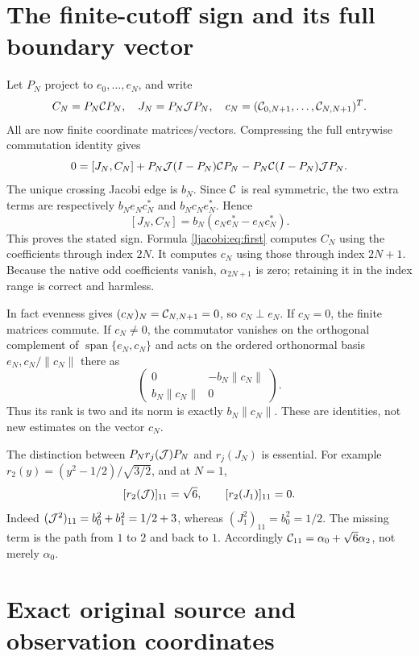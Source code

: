 \section{The finite-cutoff sign and its full boundary vector}

Let $P_N$ project to $e_0,\ldots,e_N$, and write
\[
 C_N=P_N\mathcal C P_N,\quad J_N=P_N\mathcal J P_N,\quad
 c_N=(\mathcal C_{0,N+1},\ldots,\mathcal C_{N,N+1})^T.
\]
All are now finite coordinate matrices/vectors. Compressing the
full entrywise commutation identity gives
\[
 0=[J_N,C_N]+P_N\mathcal J(I-P_N)\mathcal C P_N
                    -P_N\mathcal C(I-P_N)\mathcal J P_N.
\]
The unique crossing Jacobi edge is $b_N$. Since $\mathcal C$ is real
symmetric, the two extra terms are respectively $b_Ne_Nc_N^*$
and $b_Nc_Ne_N^*$. Hence
\begin{equation}\label{ljacobi:eq:cutoff}
 \boxed{[J_N,C_N]=b_N(c_Ne_N^*-e_Nc_N^*).}
\end{equation}
This proves the stated sign. Formula \eqref{ljacobi:eq:first} computes
$C_N$ using the coefficients through index $2N$. It computes $c_N$
using those through index $2N+1$. Because the native odd coefficients
vanish, $\alpha_{2N+1}$ is zero; retaining it in the index range is
correct and harmless.

In fact evenness gives $(c_N)_N=\mathcal C_{N,N+1}=0$, so $c_N\perp e_N$.
If $c_N=0$, the finite matrices commute. If $c_N\ne0$, the
commutator vanishes on the orthogonal complement of
$\operatorname{span}\{e_N,c_N\}$ and acts on the ordered orthonormal
basis $e_N,c_N/\|c_N\|$ there as
\[
 \begin{pmatrix}0&-b_N\|c_N\|\\b_N\|c_N\|&0\end{pmatrix}.
\]
Thus its rank is two and its norm is exactly $b_N\|c_N\|$.
These are identities, not new estimates on the vector $c_N$.

The distinction between $P_Nr_j(\mathcal J)P_N$ and $r_j(J_N)$ is essential.
For example $r_2(y)=(y^2-1/2)/\sqrt{3/2}$, and at $N=1$,
\[
 [r_2(\mathcal J)]_{11}=\sqrt6,\qquad [r_2(J_1)]_{11}=0.
\]
Indeed $(\mathcal J^2)_{11}=b_0^2+b_1^2=1/2+3$, whereas
$(J_1^2)_{11}=b_0^2=1/2$. The missing term is the path from $1$
to $2$ and back to $1$. Accordingly
$\mathcal C_{11}=\alpha_0+\sqrt6\alpha_2$, not merely $\alpha_0$.

\section{Exact original source and observation coordinates}


